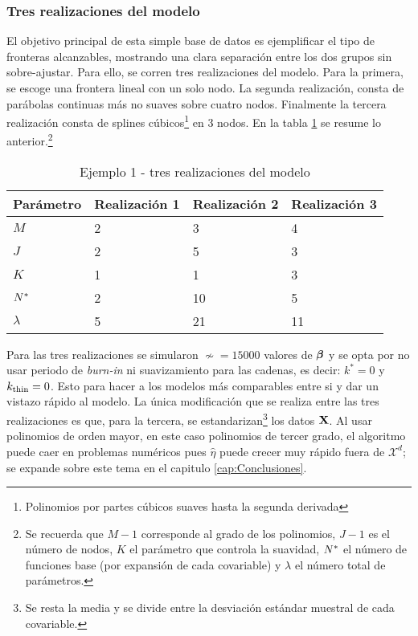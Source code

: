 \documentclass[../Main/Main.tex]{subfiles}
\begin{document}
\subsubsection*{Tres realizaciones del modelo}
El objetivo principal de esta simple base de datos es ejemplificar el tipo de fronteras alcanzables, mostrando una clara separación entre los dos grupos sin sobre-ajustar. Para ello, se corren tres realizaciones del modelo. Para la primera, se escoge una frontera lineal con un solo nodo. La segunda realización, consta de parábolas continuas más no suaves sobre cuatro nodos. Finalmente la tercera realización consta de splines cúbicos\footnote{Polinomios por partes cúbicos suaves hasta la segunda derivada} en 3 nodos. En la tabla \ref{tab:Ejemplo1Modelos} se resume lo anterior.\footnote{Se recuerda que $M-1$ corresponde al grado de los polinomios, $J-1$ es el número de nodos, $K$ el parámetro que controla la suavidad, $N^*$ el número de funciones base (por expansión de cada covariable) y $\lambda$ el número total de parámetros.}
\begin{table}[H]
\centering
\begin{tabular}{l|lll}
\hline
Parámetro & Realización 1 & Realización 2 & Realización 3 \\ \hline\hline
$M$       & 2        & 3        & 4        \\ \hline
$J$       & 2        & 5        & 3        \\ \hline
$K$       & 1        & 1        & 3        \\ \hline\hline
$N^*$      & 2        & 10       & 5        \\ \hline
$\lambda$ & 5        & 21       & 11       \\ \hline
\end{tabular}
\caption{Ejemplo 1 - tres realizaciones del modelo}
\label{tab:Ejemplo1Modelos}
\end{table}
Para las tres realizaciones se simularon $\nsim = \num{15000}$ valores de $\bm{\beta}$ y se opta por no usar periodo de \textit{burn-in} ni suavizamiento para las cadenas, es decir: $k^* = 0$ y $k_{\text{thin}} = 0$. Esto para hacer a los modelos más comparables entre si y dar un vistazo rápido al modelo. La única modificación que se realiza entre las tres realizaciones es que, para la tercera, se estandarizan\footnote{Se resta la media y se divide entre la desviación estándar muestral de cada covariable.} los datos $\mathbf{X}$. Al usar polinomios de orden mayor, en este caso polinomios de tercer grado, el algoritmo puede caer en problemas numéricos pues $\hat{\eta}$ puede crecer muy rápido fuera de $\mathcal{X}^d$; se expande sobre este tema en el capitulo \ref{cap:Conclusiones}. 
\end{document}
